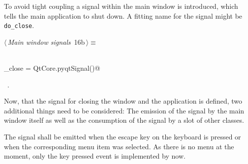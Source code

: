 \documentclass[
    a4paper,      %
    10pt,         %
    openright,    %
    notitlepage,  %
    parskip=half, %
]{scrreprt}       %
\theoremstyle{definition}                    %
\begin{document}
To avoid tight coupling a signal within the main window is introduced, which
tells the main application to shut down. A fitting name for the signal might be
\verb=do_close=.

\begin{flushleft} \small
\begin{minipage}{\linewidth}\label{scrap6}\raggedright\small
{} $\langle\,${\itshape Main window signals}\nobreak\ {\footnotesize {16b}}$\,\rangle\equiv$
\vspace{-1exm}
\begin{list}{}{} \item
\mbox{}\lstinline@@\\
\mbox{}\lstinline@do_close = QtCore.pyqtSignal()@\\
\mbox{}\lstinline@@{\NWsep}
\end{list}
\vspace{-1.5ex}
\footnotesize
\begin{list}{}{\setlength{\itemsep}{-\parsep}\setlength{\itemindent}{-\leftmargin}}
\item \NWtxtMacroRefIn\ .

\item{}
\end{list}
\end{minipage}\vspace{4ex}
\end{flushleft}
Now, that the signal for closing the window and the application is defined, two
additional things need to be considered: The emission of the signal by
the main window itself as well as the consumption of the signal by a slot of
other classes.

The signal shall be emitted when the escape key on the keyboard is pressed or
when the corresponding menu item was selected. As there is no menu at the
moment, only the key pressed event is implemented by now.
\end{document}

